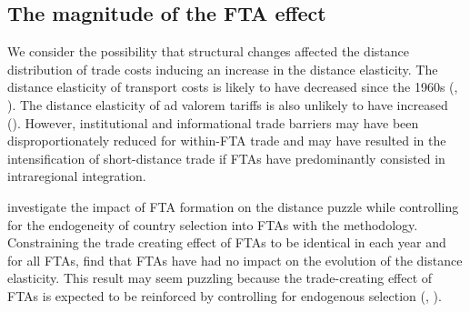 \documentclass[12pt,twoside,a4paper,notitlepage]{article}
\begin{document}
\subsection{The magnitude of the FTA effect} \label{subsec:distdistrib}
We consider the possibility that structural changes affected the distance distribution of trade costs inducing an increase in the distance elasticity. The distance elasticity of transport costs is likely to have decreased since the 1960s (\cite{Hummels2007}, \cite{Berthelon2008}). The distance elasticity of ad valorem tariffs is also unlikely to have increased (\cite{Berthelon2008}). However, institutional and informational trade barriers may have been disproportionately reduced for within-FTA trade and may have resulted in the intensification of short-distance trade if FTAs have predominantly consisted in intraregional integration. 

\cite{Bosquet2015} investigate the impact of FTA formation on the distance puzzle while controlling for the endogeneity of country selection into FTAs with the \cite{Baier2007} methodology. Constraining the trade creating effect of FTAs to be identical in each year and for all FTAs, \cite{Bosquet2015} find that FTAs have had no impact on the evolution of the distance elasticity. This result may seem puzzling because the trade-creating effect of FTAs is expected to be reinforced by controlling for endogenous selection (\cite{Baier2007}, \cite{Egger2011}). 
\end{document}

